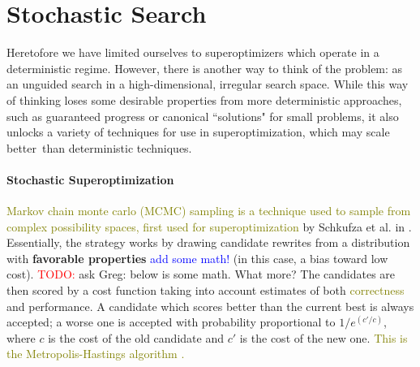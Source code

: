 \documentclass[12pt,twoside]{reedthesis}
\newcommand{\red}[1]{\textcolor{red}{#1}}
\newcommand{\green}[1]{\textcolor{olive}{#1}}
\newcommand{\comment}[2]{\textbf{#1} \textcolor{blue}{#2}}
\newcommand{\addressed}[2]{{#1}}
\begin{document}
\chapter{Stochastic Search}
Heretofore we have limited ourselves to superoptimizers which operate in a deterministic regime.
However, there is another way to think of the problem: as an unguided search in a high-dimensional, irregular search space.
While this way of thinking loses some desirable properties from more deterministic approaches, such as guaranteed progress or canonical ``solutions" for small problems, it also unlocks a variety of techniques for use in superoptimization, which may scale better\footnotemark\, than deterministic techniques.
    
\subsubsection{Stochastic Superoptimization}
\green{Markov chain monte carlo (MCMC) sampling is a technique used to sample from complex possibility spaces, first used for superoptimization} by Schkufza et al. in \cite{schkufza2013stoke}.
Essentially, the strategy works by drawing candidate rewrites from a distribution with 
    \comment{favorable properties}{add some math!} (in this case, a bias toward low cost).
\red{TODO:} ask Greg: below is some math. What more?
The candidates are then scored by a cost function taking into account estimates of both \green{correctness} and performance.
A candidate which scores better than the current best is always accepted; a worse one is accepted with probability proportional to $1/e^{(c'/c)}$, where $c$ is the cost of the old candidate and $c'$ is the cost of the new one. 
\green{This is the Metropolis-Hastings algorithm \cite{metropolis1953montecarlo} \cite{hastings1970mcmc}.}
    
\end{document}
